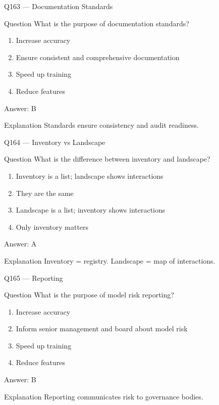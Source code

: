 \documentclass[aspectratio=169,8pt]{beamer}
\begin{document}
	\begin{frame}{Q163 --- Documentation Standards}
		\begin{block}{Question}
			What is the purpose of documentation standards?
		\end{block}
		\begin{enumerate}
			\item Increase accuracy
			\item Ensure consistent and comprehensive documentation
			\item Speed up training
			\item Reduce features
		\end{enumerate}
		\begin{exampleblock}{Answer: B}\end{exampleblock}
		\begin{block}{Explanation}
			Standards ensure consistency and audit readiness.
		\end{block}
	\end{frame}
	
	\begin{frame}{Q164 --- Inventory vs Landscape}
		\begin{block}{Question}
			What is the difference between inventory and landscape?
		\end{block}
		\begin{enumerate}
			\item Inventory is a list; landscape shows interactions
			\item They are the same
			\item Landscape is a list; inventory shows interactions
			\item Only inventory matters
		\end{enumerate}
		\begin{exampleblock}{Answer: A}\end{exampleblock}
		\begin{block}{Explanation}
			Inventory = registry. Landscape = map of interactions.
		\end{block}
	\end{frame}
	
	\begin{frame}{Q165 --- Reporting}
		\begin{block}{Question}
			What is the purpose of model risk reporting?
		\end{block}
		\begin{enumerate}
			\item Increase accuracy
			\item Inform senior management and board about model risk
			\item Speed up training
			\item Reduce features
		\end{enumerate}
		\begin{exampleblock}{Answer: B}\end{exampleblock}
		\begin{block}{Explanation}
			Reporting communicates risk to governance bodies.
		\end{block}
	\end{frame}
	
\end{document}
